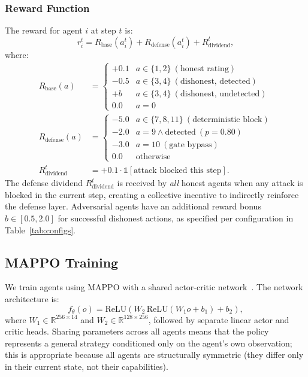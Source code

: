 \subsubsection{Reward Function}
The reward for agent $i$ at step $t$ is:
\begin{equation}
  r_i^t = R_{\text{base}}(a_i^t) + R_{\text{defense}}(a_i^t) + R_{\text{dividend}}^t,
  \label{eq:reward}
\end{equation}
where:
\begin{align}
  R_{\text{base}}(a) &= \begin{cases}
    +0.1 & a \in \{1,2\}\ (\text{honest rating}) \\
    -0.5 & a \in \{3,4\}\ (\text{dishonest, detected}) \\
    +b   & a \in \{3,4\}\ (\text{dishonest, undetected}) \\
    0.0  & a = 0
  \end{cases} \label{eq:base_reward} \\
  R_{\text{defense}}(a) &= \begin{cases}
    -5.0 & a \in \{7, 8, 11\}\ (\text{deterministic block}) \\
    -2.0 & a = 9 \wedge \text{detected}\ (p=0.80) \\
    -3.0 & a = 10\ (\text{gate bypass}) \\
    0.0  & \text{otherwise}
  \end{cases} \label{eq:defense_reward} \\
  R_{\text{dividend}}^t &= +0.1 \cdot \mathbb{1}[\text{attack blocked this step}].
  \label{eq:dividend}
\end{align}
The defense dividend $R_{\text{dividend}}^t$ is received by \emph{all} honest
agents when any attack is blocked in the current step, creating a collective
incentive to indirectly reinforce the defense layer.  Adversarial agents
have an additional reward bonus $b \in [0.5, 2.0]$ for successful dishonest
actions, as specified per configuration in Table~\ref{tab:configs}.

\subsection{MAPPO Training}
\label{sec:mappo}

We train agents using MAPPO with a shared actor-critic
network~\cite{yu2021surprising}.  The network architecture is:
\begin{equation}
  f_\theta(o) = \text{ReLU}(W_2\,\text{ReLU}(W_1 o + b_1) + b_2),
  \label{eq:network}
\end{equation}
where $W_1 \in \mathbb{R}^{256 \times 14}$ and $W_2 \in \mathbb{R}^{128
\times 256}$, followed by separate linear actor and critic heads.  Sharing
parameters across all agents means that the policy represents a general
strategy conditioned only on the agent's own observation; this is appropriate
because all agents are structurally symmetric (they differ only in their
current state, not their capabilities).

